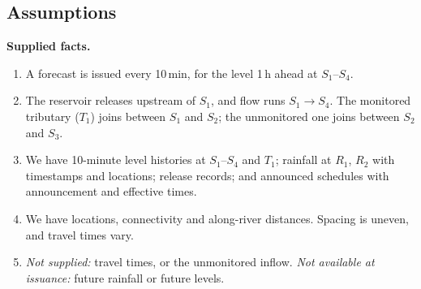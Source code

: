 \documentclass[11pt,a4paper]{article}
\begin{document}
\subsection{Assumptions}
\textbf{Supplied facts.}
\begin{enumerate}[label=\textbf{F\arabic*}, ref=F\arabic*, leftmargin=*]
  \item A forecast is issued every 10\,min, for the level 1\,h ahead at $S_1$--$S_4$.
  \item The reservoir releases upstream of $S_1$, and flow runs $S_1\!\to\!S_4$.
        The monitored tributary ($T_1$) joins between $S_1$ and $S_2$; the
        unmonitored one joins between $S_2$ and $S_3$.
  \item We have 10-minute level histories at $S_1$--$S_4$ and $T_1$; rainfall at
        $R_1$, $R_2$ with timestamps and locations; release records; and
        announced schedules with announcement and effective times.
  \item We have locations, connectivity and along-river distances. Spacing is
        uneven, and travel times vary.
  \item \emph{Not supplied:} travel times, or the unmonitored inflow.
        \emph{Not available at issuance:} future rainfall or future levels.
\end{enumerate}
\end{document}
